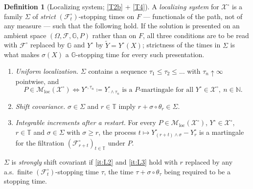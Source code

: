 \documentclass[11pt,a4paper]{article}
\theoremstyle{plain}
\theoremstyle{definition}
\newtheorem{definition}[theorem]{Definition}
\theoremstyle{remark}
\newcommand{\N}{\mathbb{N}}
\newcommand{\T}{\mathbb{T}}                     %
\newcommand{\Filt}{\mathcal{F}}
\newcommand{\XX}{\mathcal{X}}                  %
\newcommand{\Msol}{\mathcal{M}}
\begin{document}
\begin{definition}[Localizing system; \eqref{T2b} + \eqref{T4}]
  \label{def:localizing}
  A \emph{localizing system} for $\XX^\circ$ is a family $\Sigma$ of
  \emph{strict} $(\Filt^\circ_t)$-stopping times on $F$ --- functionals of the
  path, not of any measure --- such that the following hold.  If the solution is
  presented on an ambient space $(\Omega,\Filt,\mathbb{G},P)$ rather than on $F$, all
  three conditions are to be read with $\Filt^\circ$ replaced by $\mathbb{G}$ and
  $Y^\circ$ by $\tilde{Y} = Y^\circ(X)$; strictness of the times in $\Sigma$ is
  what makes $\sigma(X)$ a $\mathbb{G}$-stopping time for every such presentation.
  \begin{enumerate}[label=(L\arabic*)]
  \item \label{it:L1}
    \emph{Uniform localization.}  $\Sigma$ contains a sequence
    $\tau_1 \leq \tau_2 \leq \dots$ with $\tau_n \uparrow \infty$ pointwise, and
    \[
      P \in \Msol_{\mathrm{loc}}(\XX^\circ)
      \iff
      Y^{\circ,\tau_n} \coloneqq Y^\circ_{\cdot \wedge \tau_n}
      \text{ is a $P$-martingale for all } Y^\circ \in \XX^\circ,\ n \in \N .
    \]
  \item \label{it:L2}
    \emph{Shift covariance.}  $\sigma \in \Sigma$ and $r \in \T$ imply
    $r + \sigma \circ \theta_r \in \Sigma$.
  \item \label{it:L3}
    \emph{Integrable increments after a restart.}  For every
    $P \in \Msol_{\mathrm{loc}}(\XX^\circ)$, $Y^\circ \in \XX^\circ$,
    $r \in \T$ and $\sigma \in \Sigma$ with $\sigma \geq r$, the process
    $t \mapsto Y^\circ_{(r+t) \wedge \sigma} - Y^\circ_r$ is a martingale for the
    filtration $(\Filt^\circ_{r+t})_{t \in \T}$ under $P$.
  \end{enumerate}
  $\Sigma$ is \emph{strongly} shift covariant if \ref{it:L2} and \ref{it:L3} hold
  with $r$ replaced by any a.s.\ finite $(\Filt^\circ_t)$-stopping time $\tau$,
  the time $\tau + \sigma \circ \theta_\tau$ being required to be a stopping time.
\end{definition}
\end{document}
